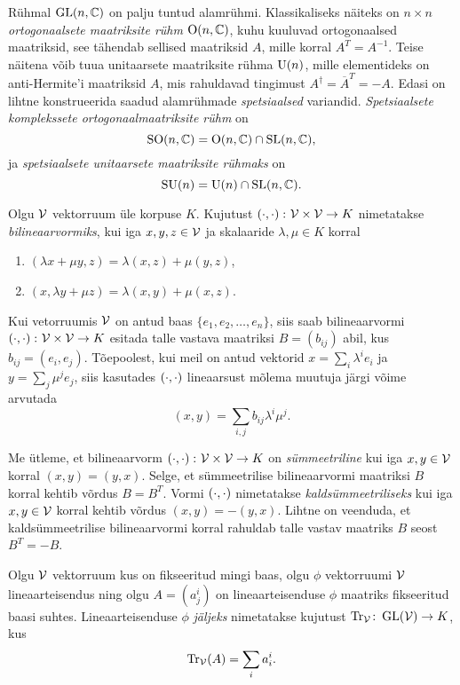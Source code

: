 Rühmal $\operatorname{GL}(n, \mathbb{C})$ on palju tuntud alamrühmi. Klassikaliseks näiteks on
$n \times n$ \emph{ortogonaalsete maatriksite rühm} $\operatorname{O}(n, \mathbb{C})$, kuhu kuuluvad
ortogonaalsed maatriksid, see tähendab sellised maatriksid $A$, mille korral
$A^T = A^{-1}$. Teise näitena võib tuua unitaarsete maatriksite rühma $\operatorname{U}(n)$,
mille elementideks on anti-Hermite'i maatriksid $A$, mis rahuldavad tingimust
$A^\dag = \overline{A}^T = -A$. Edasi on lihtne konstrueerida saadud alamrühmade
\emph{spetsiaalsed} variandid. \emph{Spetsiaalsete komplekssete ortogonaalmaatriksite rühm} on
\[ \operatorname{SO}(n, \mathbb{C}) = \operatorname{O}(n, \mathbb{C}) \cap \operatorname{SL}(n, \mathbb{C}), \]
ja \emph{spetsiaalsete unitaarsete maatriksite rühmaks} on
\[ \operatorname{SU}(n) = \operatorname{U}(n) \cap \operatorname{SL}(n, \mathbb{C}). \]

\begin{dfn}
    Olgu $\mathcal{V}$ vektorruum üle korpuse $K$. Kujutust
    $\left( \cdot, \cdot \right) \colon \mathcal{V} \times \mathcal{V} \to K$
    nimetatakse \emph{bilineaarvormiks}, kui iga $x, y, z \in \mathcal{V}$
    ja skalaaride $\lambda, \mu \in K$ korral
    \begin{enumerate}[label=\roman*.]
        \item $(\lambda x + \mu y, z) = \lambda (x, z) + \mu (y, z)$,
        \item $(x, \lambda y + \mu z) = \lambda (x, y) + \mu (x, z)$.
    \end{enumerate}
\end{dfn}

Kui vetorruumis $\mathcal{V}$ on antud baas $\{e_1, e_2, \dots, e_n\}$, siis saab
bilineaarvormi $\left( \cdot, \cdot \right) \colon \mathcal{V} \times \mathcal{V} \to K$ esitada talle vastava maatriksi
$B = (b_{ij})$ abil, kus $b_{ij} = (e_i, e_j)$. Tõepoolest, kui
meil on antud vektorid $x = \sum_i \lambda^i e_i$ ja $y = \sum_j \mu^j e_j$,
siis kasutades $\left( \cdot, \cdot \right)$ lineaarsust mõlema muutuja järgi võime arvutada
\[ (x, y) = \sum_{i, j} b_{ij} \lambda^i \mu^j. \]

Me ütleme, et bilineaarvorm $\left( \cdot, \cdot \right) \colon \mathcal{V} \times \mathcal{V} \to K$ on
\emph{sümmeetriline} kui
iga $x, y \in \mathcal{V}$ korral $(x, y) = (y, x)$. Selge, et sümmeetrilise
bilineaarvormi maatriksi $B$ korral kehtib võrdus $B = B^T$. Vormi $\left( \cdot, \cdot \right)$
nimetatakse \emph{kaldsümmeetriliseks} kui iga $x, y \in \mathcal{V}$ korral kehtib
võrdus $(x, y) = - (y, x)$. Lihtne on veenduda, et kaldsümmeetrilise
bilineaarvormi korral rahuldab talle vastav maatriks $B$ seost
$B^T = -B$.

\begin{dfn}
    Olgu $\mathcal{V}$ vektorruum kus on fikseeritud mingi baas, olgu $\phi$
    vektorruumi $\mathcal{V}$ lineaarteisendus ning olgu $A = (a^i_j)$ on
    lineaarteisenduse $\phi$ maatriks fikseeritud baasi suhtes.
    Lineaarteisenduse $\phi$ \emph{jäljeks} nimetatakse kujutust
    $\operatorname{Tr}_{\mathcal{V}} \colon \operatorname{GL}(\mathcal{V}) \to K$, kus
    \[ \operatorname{Tr}_{\mathcal{V}}(A) = \sum_i a^i_i. \]
\end{dfn}

